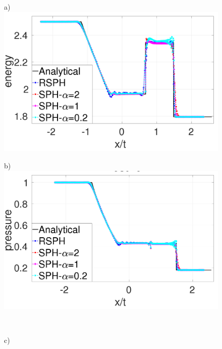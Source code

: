\documentclass[review]{elsarticle}
\begin{document}
\begin{figure}[H]
    \centering
    \begin{minipage}{.495\textwidth}
        \centering a)
        \includegraphics[width=0.99 \textwidth,height=0.7\textwidth]{./Figures/RCM-Sod-SPH-alf-e}
    \end{minipage}%
    \begin{minipage}{.495 \textwidth}
        \centering b)
        \includegraphics[width=0.99 \textwidth,height=0.7\textwidth]{./Figures/RCM-Sod-SPH-alf-p}
    \end{minipage}%
    \\
    \begin{minipage}{.495 \textwidth}
        \centering c)

\end{minipage}
\end{figure}
\end{document}
